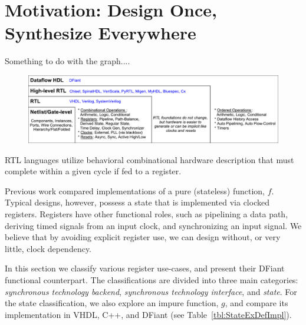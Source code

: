 \section{Motivation: Design Once, Synthesize Everywhere}
\label{sec:motivation}
Something to do with the graph....
\begin{figure}[t!]
	\centering
	\includegraphics[width=\linewidth]{graphics/motivation.pdf} 
	\label{fig:motivation}
\end{figure}
RTL languages utilize behavioral combinational hardware description that must complete within a given cycle if fed to a register.

Previous work \cite{Port2017} compared implementations of a pure (stateless) function, $f$. Typical designs, however, possess a state that is implemented via clocked registers. Registers have other functional roles, such as pipelining a data path, deriving timed signals from an input clock, and synchronizing an input signal. We believe that by avoiding explicit register use, we can design without, or very little, clock dependency. 

In this section we classify various register use-cases, and present their DFiant functional counterpart. The classifications are divided into three main categories: \textit{synchronous technology backend}, \textit{synchronous technology interface}, and \textit{state}. For the state classification, we also explore an impure function, $g$, and compare its implementation in VHDL, C++, and DFiant (see Table~\ref{tbl:StateExDefImpl}).


